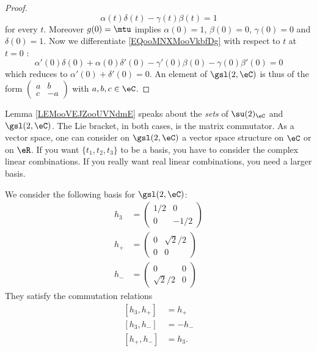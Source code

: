 \begin{proof}
\begin{equation}
		\alpha(t)\delta(t)-\gamma(t)\beta(t)=1
	\end{equation}
	for every \( t\).  Moreover \( g(0)=\mtu\) implies \( \alpha(0)=1\), \( \beta(0)=0\), \( \gamma(0)=0\) and \( \delta(0)=1\). Now we differentiate \eqref{EQooMNXMooVkbfDg} with respect to \( t\) at \( t=0\) :
	\begin{equation}
		\alpha'(0)\delta(0)+\alpha(0)\delta'(0)-\gamma'(0)\beta(0)-\gamma(0)\beta'(0)=0
	\end{equation}
	which reduces to \( \alpha'(0)+\delta'(0)=0\). An element of \( \gsl(2,\eC)\) is thus of the form \( \begin{pmatrix}
		a & b  \\
		c & -a
	\end{pmatrix}\) with \( a,b,c\in \eC\).
\end{proof}

\begin{normaltext}
	Lemma \ref{LEMooVEJZooUVNdmE} speaks about the \emph{sets} of \( \su(2)_{\eC}\) and \( \gsl(2,\eC)\). The Lie bracket, in both cases, is the matrix commutator. As a vector space, one can consider on \( \gsl(2,\eC)\) a vector space structure on \( \eC\) or on \( \eR\). If you want \( \{ t_1, t_2, t_3 \}\) to be a basis, you have to consider the complex linear combinations. If you really want real linear combinations, you need a larger basis.
\end{normaltext}

We consider the following basis for \( \gsl(2,\eC)\):
\begin{subequations}        \label{EQSooORIBooAsgdDp}
	\begin{align}
		h_3 & =\begin{pmatrix}
			       1/2 & 0    \\
			       0   & -1/2
		       \end{pmatrix}   \\
		h_+ & =\begin{pmatrix}
			       0 & \sqrt{ 2 }/2 \\
			       0 & 0
		       \end{pmatrix} \\
		h_- & =\begin{pmatrix}
			       0            & 0 \\
			       \sqrt{ 2 }/2 & 0
		       \end{pmatrix}
	\end{align}
\end{subequations}
They satisfy the commutation relations
\begin{subequations}        \label{SUBEQSooXMMVooKtnRXW}
	\begin{align}
		[h_3,h_+] & =h_+  \\
		[h_3,h_-] & =-h_- \\
		[h_+,h_-] & =h_3.
	\end{align}
\end{subequations}

